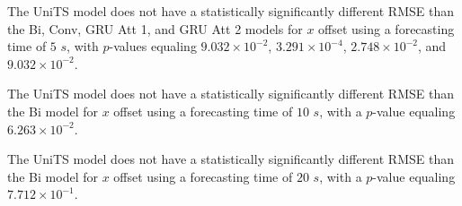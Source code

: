 
The UniTS model does not have a statistically significantly different RMSE than the Bi, Conv, GRU Att 1, and GRU Att 2 models for $x$ offset using a forecasting time of $5$ $s$, with $p$-values equaling $9.032 \times 10^{-2}$, $3.291 \times 10^{-4}$, $2.748 \times 10^{-2}$, and $9.032 \times 10^{-2}$.


The UniTS model does not have a statistically significantly different RMSE than the Bi model for $x$ offset using a forecasting time of $10$ $s$, with a $p$-value equaling $6.263 \times 10^{-2}$.


The UniTS model does not have a statistically significantly different RMSE than the Bi model for $x$ offset using a forecasting time of $20$ $s$, with a $p$-value equaling $7.712 \times 10^{-1}$.


